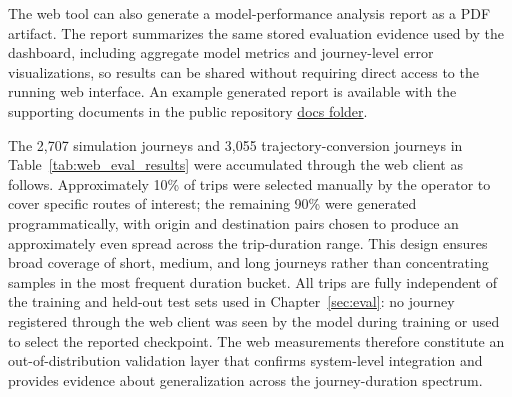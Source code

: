 The web tool can also generate a model-performance analysis report as a PDF artifact. The report summarizes the same stored evaluation evidence used by the dashboard, including aggregate model metrics and journey-level error visualizations, so results can be shared without requiring direct access to the running web interface. An example generated report is available with the supporting documents in the public repository \href{https://github.com/Turgibot/Multi-Variant-Simulated-Traffic-Dataset-Creator-and-Model-Tester/tree/master/docs}{docs folder}.

\begin{table}[!htbp]
\caption[DSTRA consistency: web-tool measurements vs.\ training-evaluation results.]{DSTRA consistency between web-tool journey measurements and the training-evaluation results from Chapter~\ref{sec:eval}. The web-tool column is computed from completed journeys stored by the \WebApp{}; the training-evaluation column is the held-out model evaluation. Differences are web-tool minus training-evaluation values. MAE, RMSE, MedAE, P90, and P95 are in seconds; MAPE is in percent.}
\label{tab:web_eval_results}
\centering
\scriptsize
\setlength{\tabcolsep}{2pt}
\end{table}



The 2,707 simulation journeys and 3,055 trajectory-conversion journeys in Table~\ref{tab:web_eval_results} were accumulated through the web client as follows. Approximately 10\% of trips were selected manually by the operator to cover specific routes of interest; the remaining 90\% were generated programmatically, with origin and destination pairs chosen to produce an approximately even spread across the trip-duration range. This design ensures broad coverage of short, medium, and long journeys rather than concentrating samples in the most frequent duration bucket. All trips are fully independent of the training and held-out test sets used in Chapter~\ref{sec:eval}: no journey registered through the web client was seen by the model during training or used to select the reported checkpoint. The web measurements therefore constitute an out-of-distribution validation layer that confirms system-level integration and provides evidence about generalization across the journey-duration spectrum.

